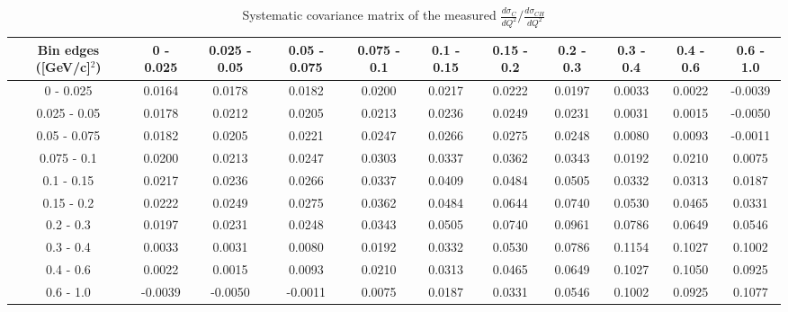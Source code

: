 \documentclass[aps,prl,twocolumn,superscriptaddress,nofootinbib]{revtex4-1}
\begin{document}
\begin{table}[h!]
  \centering
  \caption{Systematic covariance matrix of the measured $\frac{d\sigma_{C}}{dQ^{2}}/\frac{d\sigma_{CH}}{dQ^{2}}$}
    \begin{tabular}{c||cccccccccc}
      Bin edges ([GeV/c]$^{2}$) & 0 - 0.025 & 0.025 - 0.05 & 0.05 - 0.075 & 0.075 - 0.1 & 0.1 - 0.15 & 0.15 - 0.2 & 0.2 - 0.3 & 0.3 - 0.4 & 0.4 - 0.6 & 0.6 - 1.0 \\
\hline \hline
         0 - 0.025 &  0.0164 &  0.0178 &  0.0182 &  0.0200 &  0.0217 &  0.0222 &  0.0197 &  0.0033 &  0.0022 & -0.0039 \\
      0.025 - 0.05 &  0.0178 &  0.0212 &  0.0205 &  0.0213 &  0.0236 &  0.0249 &  0.0231 &  0.0031 &  0.0015 & -0.0050 \\
      0.05 - 0.075 &  0.0182 &  0.0205 &  0.0221 &  0.0247 &  0.0266 &  0.0275 &  0.0248 &  0.0080 &  0.0093 & -0.0011 \\
       0.075 - 0.1 &  0.0200 &  0.0213 &  0.0247 &  0.0303 &  0.0337 &  0.0362 &  0.0343 &  0.0192 &  0.0210 &  0.0075 \\
        0.1 - 0.15 &  0.0217 &  0.0236 &  0.0266 &  0.0337 &  0.0409 &  0.0484 &  0.0505 &  0.0332 &  0.0313 &  0.0187 \\
        0.15 - 0.2 &  0.0222 &  0.0249 &  0.0275 &  0.0362 &  0.0484 &  0.0644 &  0.0740 &  0.0530 &  0.0465 &  0.0331 \\
         0.2 - 0.3 &  0.0197 &  0.0231 &  0.0248 &  0.0343 &  0.0505 &  0.0740 &  0.0961 &  0.0786 &  0.0649 &  0.0546 \\
         0.3 - 0.4 &  0.0033 &  0.0031 &  0.0080 &  0.0192 &  0.0332 &  0.0530 &  0.0786 &  0.1154 &  0.1027 &  0.1002 \\
         0.4 - 0.6 &  0.0022 &  0.0015 &  0.0093 &  0.0210 &  0.0313 &  0.0465 &  0.0649 &  0.1027 &  0.1050 &  0.0925 \\
         0.6 - 1.0 & -0.0039 & -0.0050 & -0.0011 &  0.0075 &  0.0187 &  0.0331 &  0.0546 &  0.1002 &  0.0925 &  0.1077 \\
    \end{tabular}
  \label{tablecov:C_Systematic_Q2}
\end{table}
\end{document}
